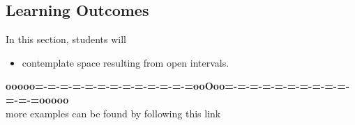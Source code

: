 \documentclass{ximera}
\begin{document}
\subsection{Learning Outcomes}


\begin{sectionOutcomes}
In this section, students will 

\begin{itemize}
\item contemplate space resulting from open intervals.
\end{itemize}
\end{sectionOutcomes}













\begin{center}
\textbf{\textcolor{green!50!black}{ooooo=-=-=-=-=-=-=-=-=-=-=-=-=ooOoo=-=-=-=-=-=-=-=-=-=-=-=-=ooooo}} \\

more examples can be found by following this link\\ 

\end{center}
\end{document}
